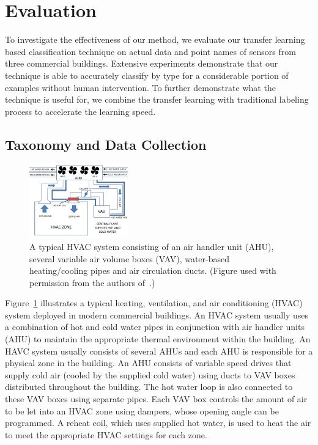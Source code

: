 \section{Evaluation}
To investigate the effectiveness of our method, we evaluate our transfer learning based classification technique on actual data and point names of sensors from three commercial buildings. Extensive experiments demonstrate that our technique is able to accurately classify by type for a considerable portion of examples without human intervention. 
To further demonstrate what the technique is useful for, we combine the transfer learning with traditional labeling process to accelerate the learning speed.


\subsection{Taxonomy and Data Collection}
\begin{figure}[t]
\centering
\includegraphics[width=0.38\textwidth]{./fig/hvac}
\caption{A typical HVAC system consisting of an air handler unit (AHU), several variable air volume boxes (VAV), water-based heating/cooling pipes and air circulation ducts. (Figure used with permission from the authors of~\cite{sentinel}.)}
\label{fig:hvac}
\end{figure}

Figure~\ref{fig:hvac} illustrates a typical heating, ventilation, and air conditioning (HVAC) system deployed in modern commercial buildings. 
An HVAC system usually uses a combination of hot and cold water pipes in conjunction with
air handler units (AHU) to maintain the appropriate thermal environment within the building.
An HAVC system usually consists of several AHUs and each AHU is responsible for a physical zone
in the building. An AHU consists of variable speed drives that supply cold air
(cooled by the supplied cold water) using ducts to VAV boxes distributed throughout the building.
The hot water loop is also connected to these VAV boxes using separate pipes. Each VAV box
controls the amount of air to be let into an HVAC zone using dampers, whose opening angle
can be programmed. A reheat coil, which uses supplied hot water, is used to heat the air to
meet the appropriate HVAC settings for each zone.

